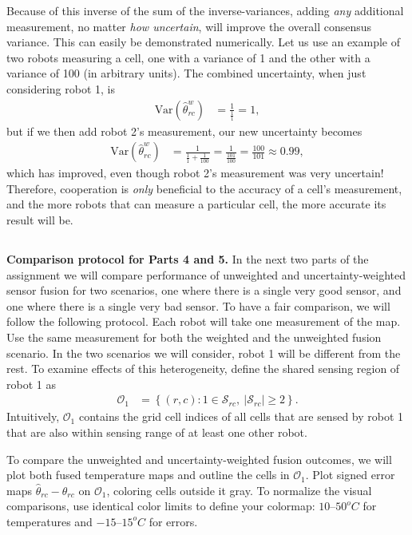 \documentclass[12pt]{article}
\begin{document}
\begin{enumerate}[label=(\alph*)]
    Because of this inverse of the sum of the inverse-variances, adding \textit{any} additional measurement, no matter \textit{how uncertain}, will improve the overall consensus variance. This can easily be demonstrated numerically. Let us use an example of two robots measuring a cell, one with a variance of 1 and the other with a variance of 100 (in arbitrary units). The combined uncertainty, when just considering robot 1, is
    \begin{align*}
        \text{Var}(\hat\theta_{rc}^w)&=\frac{1}{\frac11}=1,
    \end{align*}
    but if we then add robot 2's measurement, our new uncertainty becomes
    \begin{align*}
        \text{Var}(\hat\theta_{rc}^w)&=\frac{1}{\frac11+\frac1{100}}=\frac1{\frac{101}{100}}=\frac{100}{101}\approx0.99,
    \end{align*}
    which has improved, even though robot 2's measurement was very uncertain! Therefore, cooperation is \textit{only} beneficial to the accuracy of a cell's measurement, and the more robots that can measure a particular cell, the more accurate its result will be.
\end{enumerate}

\clearpage
\subsection*{}
\textbf{Comparison protocol for Parts 4 and 5.}
In the next two parts of the assignment we will compare performance of unweighted and uncertainty-weighted sensor fusion for two scenarios, one where there is a single very good sensor, and one where there is a single very bad sensor. To have a fair comparison, we will follow the following protocol.
Each robot will take one measurement of the map. Use the same measurement for both the weighted and the unweighted fusion scenario. In the two scenarios we will consider, robot 1 will be different from the rest. To examine effects of this heterogeneity, define the shared sensing region of robot 1 as
\begin{align*}
    \mathcal O_1&=\left\{(r,c):1\in\mathcal S_{rc},\ |\mathcal S_{rc}|\geq2\right\}.
\end{align*}
Intuitively, $\mathcal O_1$ contains the grid cell indices of all cells that are sensed by robot 1 that are also within sensing range of at least one other robot. 

To compare the unweighted and uncertainty-weighted fusion outcomes, we will plot both fused temperature maps and outline the cells in $\mathcal O_1$. Plot signed error maps $\hat\theta_{rc}-\theta_{rc}$ on $\mathcal O_1$, coloring cells outside it gray. To normalize the visual comparisons, use identical color limits to define your colormap: $10$--$50^oC$ for temperatures and $-15$--$15^oC$ for errors.
\end{document}
